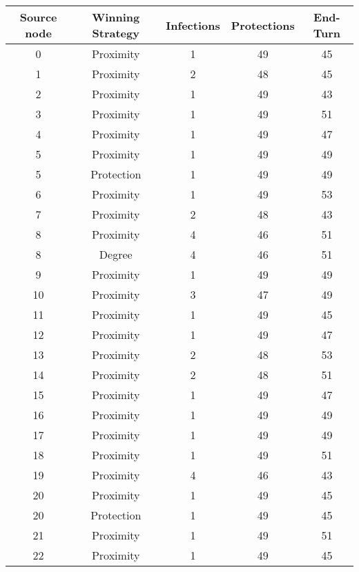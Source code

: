 \documentclass[results.tex]{subfiles}
\begin{document}
\begin{center}
  \begin{tabular}{| c || c | c | c | c |}
    \hline
    {\bfseries Source node} & {\bfseries Winning Strategy} & {\bfseries Infections} & {\bfseries Protections} & {\bfseries End-Turn} \\  %
    \hline\hline
    0 & Proximity & 1 & 49 & 45 \\ 
    \hline
    1 & Proximity & 2 & 48 & 45 \\ 
    \hline
    2 & Proximity & 1 & 49 & 43 \\ 
    \hline
    3 & Proximity & 1 & 49 & 51 \\ 
    \hline
    4 & Proximity & 1 & 49 & 47 \\ 
    \hline
    5 & Proximity & 1 & 49 & 49 \\ 
    \hline
    5 & Protection & 1 & 49 & 49 \\ 
    \hline
    6 & Proximity & 1 & 49 & 53 \\ 
    \hline
    7 & Proximity & 2 & 48 & 43 \\ 
    \hline
    8 & Proximity & 4 & 46 & 51 \\ 
    \hline
    8 & Degree & 4 & 46 & 51 \\ 
    \hline
    9 & Proximity & 1 & 49 & 49 \\ 
    \hline
    10 & Proximity & 3 & 47 & 49 \\ 
    \hline
    11 & Proximity & 1 & 49 & 45 \\ 
    \hline
    12 & Proximity & 1 & 49 & 47 \\ 
    \hline
    13 & Proximity & 2 & 48 & 53 \\ 
    \hline
    14 & Proximity & 2 & 48 & 51 \\ 
    \hline
    15 & Proximity & 1 & 49 & 47 \\ 
    \hline
    16 & Proximity & 1 & 49 & 49 \\ 
    \hline
    17 & Proximity & 1 & 49 & 49 \\ 
    \hline
    18 & Proximity & 1 & 49 & 51 \\ 
    \hline
    19 & Proximity & 4 & 46 & 43 \\ 
    \hline
    20 & Proximity & 1 & 49 & 45 \\ 
    \hline
    20 & Protection & 1 & 49 & 45 \\ 
    \hline
    21 & Proximity & 1 & 49 & 51 \\ 
    \hline
    22 & Proximity & 1 & 49 & 45 \\ 

\end{tabular}
\end{center}
\end{document}
